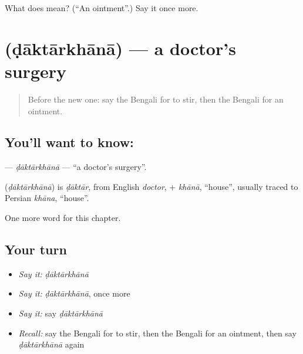 \begin{tcolorbox}[breakable,colback=teal!4,colframe=teal!35!black,title={Before you move on}]
What does  mean? (\textquotedblleft{}An ointment\textquotedblright{}.) Say it once more.
\end{tcolorbox}
\section[\texorpdfstring{\bn{ডাক্তারখানা} (ḍāktārkhānā)}{ডাক্তারখানা (ḍāktārkhānā)}]{ (ḍāktārkhānā) — a doctor's surgery}

\label{lesson:BN-C215-daktarkhana}



\begin{quote}
Before the new one: say the Bengali for to stir, then the Bengali for an ointment.
\end{quote}

\subsection*{You'll want to know: }
\textbf{} — \emph{ḍāktārkhānā} — \textquotedblleft{}a doctor's surgery\textquotedblright{}.

\begin{cousinweb}
\textbf{} (\emph{ḍāktārkhānā}) is \emph{ḍāktār}, from English \emph{doctor}, + \emph{khānā}, \textquotedblleft{}house\textquotedblright{}, usually traced to Persian \emph{khāna}, \textquotedblleft{}house\textquotedblright{}.
\end{cousinweb}

\begin{grammarlens}[title={What you've built}]
One more word for this chapter.
\end{grammarlens}

\subsection*{Your turn}
\begin{itemize}
\raggedright
  \item \emph{Say it:} \emph{ḍāktārkhānā}
  \item \emph{Say it:} \emph{ḍāktārkhānā}, once more
  \item \emph{Say it:} say \emph{ḍāktārkhānā}
  \item \emph{Recall:} say the Bengali for to stir, then the Bengali for an ointment, then say \emph{ḍāktārkhānā} again
\end{itemize}

